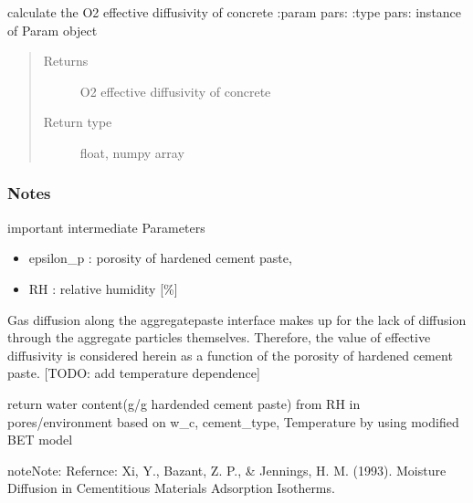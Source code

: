 \documentclass[letterpaper,10pt,english]{sphinxmanual}
\begin{document}

\begin{fulllineitems}
\label{\detokenize{corrosion:corrosion.De_O2_f}}
\sphinxAtStartPar
calculate the O2 effective diffusivity of concrete
:param pars:
:type pars: instance of Param object
\begin{quote}\begin{description}
\item[{Returns}] \leavevmode
\sphinxAtStartPar
O2 effective diffusivity of concrete

\item[{Return type}] \leavevmode
\sphinxAtStartPar
float, numpy array

\end{description}\end{quote}
\subsubsection*{Notes}

\sphinxAtStartPar
important intermediate Parameters
\begin{itemize}
\item {} 
\sphinxAtStartPar
epsilon\_p : porosity of hardened cement paste,

\item {} 
\sphinxAtStartPar
RH : relative humidity {[}\sphinxhyphen{}\%{]}

\end{itemize}

\sphinxAtStartPar
Gas diffusion along the aggregate\sphinxhyphen{}paste interface makes up for the lack of diffusion through the aggregate particles themselves.
Therefore, the value of effective diffusivity is considered herein as a function of the porosity of hardened cement paste.
{[}TODO: add temperature dependence{]}

\end{fulllineitems}


\begin{fulllineitems}
\label{\detokenize{corrosion:corrosion.RH_to_WaterbyMassHCP}}
\sphinxAtStartPar
return water content(g/g hardended cement paste) from RH in pores/environment based on w\_c, cement\_type, Temperature by using modified BET model

\begin{sphinxadmonition}{note}{Note:}
\sphinxAtStartPar
Refernce: Xi, Y., Bazant, Z. P., \& Jennings, H. M. (1993). Moisture Diffusion in Cementitious Materials Adsorption Isotherms.
\end{sphinxadmonition}

\end{fulllineitems}
\end{document}

